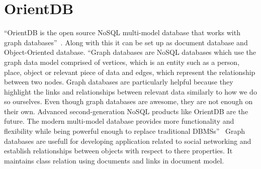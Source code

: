 \section{OrientDB}

“OrientDB is the open source NoSQL multi-model database that works with graph 
databases”~\cite{hid-sp18-520-OrientDB}. Along with this it can be set up as 
document database and Object-Oriented database. 
“Graph databases are NoSQL databases which use the graph data model comprised 
of vertices, which is an entity such as a person, place, object or relevant 
piece of data and edges, which represent the relationship between two nodes.
Graph databases are particularly helpful because they highlight the links and
relationships between relevant data similarly to how we do so ourselves.
Even though graph databases are awesome, they are not enough on their own.
Advanced second-generation NoSQL products like OrientDB are the future. The 
modern multi-model database provides more functionality and flexibility while
being powerful enough to replace traditional 
DBMSs”~\cite{hid-sp18-520-OrientDB-graph}
Graph databases are usefull for developing application related to social 
networking and establish relationships between objects with respect to there 
properties. It maintains class relation using documents and links in document 
model.